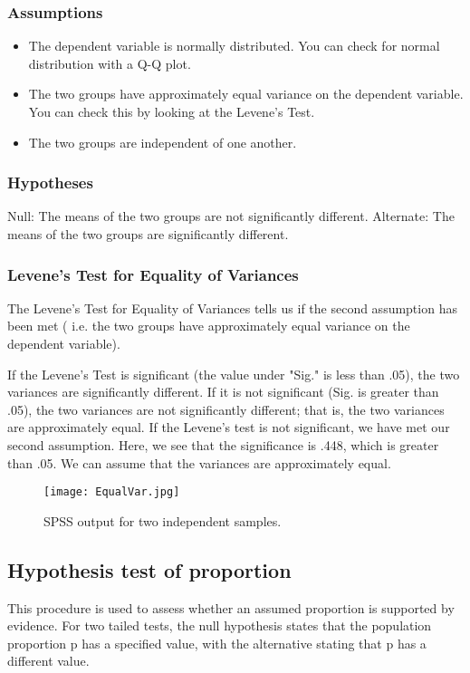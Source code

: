 \subsubsection{Assumptions}
\begin{itemize}
\item The dependent variable is normally distributed. You can check for normal distribution with a Q-Q plot.
\item The two groups have approximately equal variance on the dependent variable. You can check this by looking at the Levene's Test.
\item The two groups are independent of one another.
\end{itemize}

\subsubsection{Hypotheses}
Null: The means of the two groups are not significantly different.
Alternate: The means of the two groups are significantly different.

\subsubsection{Levene's Test for Equality of Variances}
The Levene's Test for Equality of Variances  tells us if the second assumption has been met ( i.e. the two groups have approximately equal variance on the dependent variable).

If the Levene's Test is significant (the value under "Sig." is less than .05), the two variances are significantly different. If it is not significant (Sig. is greater than .05), the two variances are not significantly different; that is, the two variances are approximately equal. If the Levene's test is not significant, we have met our second assumption. Here, we see that the significance is .448, which is greater than .05. We can assume that the variances are approximately equal.


\begin{figure}[h!]
\begin{center}
  \texttt{[image: EqualVar.jpg]}
  \caption{SPSS output for two independent samples.}\label{EqualVar}
\end{center}
\end{figure}


\subsection{Hypothesis test of proportion}
This procedure is used to assess whether an assumed proportion is supported by evidence. For two tailed tests, the null hypothesis states that the population proportion  p has a specified value, with the alternative stating that p has a different value.

